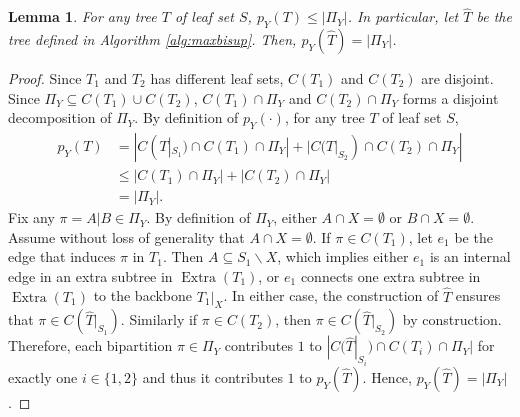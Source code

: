 \documentclass{bmcart}
\DeclareMathOperator*{\extra}{Extra}
\newtheorem{lemma}{Lemma}
\begin{document}
\begin{lemma}\label{lem:max_pY}
    For any tree $T$ of leaf set $S$, $p_Y(T) \le |\Pi_Y|$. In particular, let $\hat{T}$ be the tree defined in Algorithm \ref{alg:maxbisup}. Then, $p_Y(\hat{T}) = |\Pi_Y|$. 
\end{lemma}
\begin{proof}
    Since $T_1$ and $T_2$ has different leaf sets, $C(T_1)$ and $C(T_2)$ are disjoint. Since $\Pi_Y \subseteq C(T_1)\cup C(T_2)$, $C(T_1) \cap \Pi_Y$ and $C(T_2)\cap \Pi_Y$ forms a disjoint decomposition of $\Pi_Y$. By definition of $p_Y(\cdot)$, for any tree $T$ of leaf set $S$,
    \begin{align*}
        p_Y(T) &= |C(T|_{S_1}) \cap C(T_1) \cap \Pi_Y| + |C(T|_{S_2}) \cap C(T_2) \cap \Pi_Y| \\
        &\le |C(T_1) \cap \Pi_Y| + | C(T_2) \cap \Pi_Y| \\
        &= |\Pi_Y|.
    \end{align*}
    Fix any $\pi = A|B \in \Pi_Y$. By definition of $\Pi_Y$, either $A \cap X = \emptyset$ or $B \cap X = \emptyset$. Assume without loss of generality that $A \cap X = \emptyset$. If $\pi \in C(T_1)$, let $e_1$ be the edge that induces $\pi$ in $T_1$. Then $A \subseteq S_1 \backslash X$, which implies either $e_1$ is an internal edge in an extra subtree in $\extra(T_1)$, or $e_1$ connects one extra subtree in $\extra(T_1)$ to the backbone $T_1|_X$. In either case, the construction of $\hat{T}$ ensures that $\pi \in C(\hat{T}|_{S_1})$. Similarly if $\pi \in C(T_2)$, then $\pi \in C(\hat{T}|_{S_2})$ by construction. Therefore, each bipartition $\pi \in \Pi_Y$ contributes $1$ to $|C(\hat{T}|_{S_i}) \cap C(T_i) \cap \Pi_Y|$ for exactly one $i \in \{1,2\}$ and thus it contributes $1$ to $p_Y(\hat{T})$. Hence, $p_Y(\hat{T}) = |\Pi_Y|$.
\end{proof}
\end{document}
